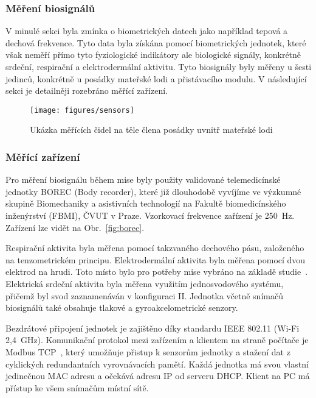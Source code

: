 \subsubsection{Měření biosignálů}
\label{subsubsec:mereni_biosignalu}
V minulé sekci byla zmínka o biometrických datech jako například tepová a
dechová frekvence. Tyto data byla získána pomocí biometrických jednotek, které
však neměří přímo tyto fyziologické indikátory ale biologické signály, konkrétně
srdeční, respirační a elektrodermální aktivitu. Tyto biosignály byly měřeny u
šesti jedinců, konkrétně u posádky mateřské lodi a přistávacího modulu. V
následující sekci je detailněji rozebráno měřící zařízení.

\begin{figure}[h]
    \begin{center}
        \texttt{[image: figures/sensors]}
        \caption{Ukázka měřících čidel na těle člena posádky uvnitř mateřské lodi}
        \label{fig:sensors}
    \end{center}
\end{figure}

\subsubsection{Měřící zařízení}
\label{subsubsec:merici_zarizeni}
Pro měření biosignálu během mise byly použity validované telemedicínské jednotky
\gls{BOREC} (Body recorder), které již dlouhodobě vyvíjíme ve výzkumné skupině
Biomechaniky a asistivních technologií na Fakultě biomedicínského inženýrství
(\gls{FBMI}), ČVUT v Praze. Vzorkovací frekvence zařízení je 250~Hz. Zařízení lze
vidět na Obr.~\ref{fig:borec}.

Respirační aktivita byla měřena pomocí takzvaného dechového pásu, založeného na
tenzometrickém principu. Elektrodermální aktivita byla měřena pomocí dvou
elektrod na hrudi. Toto místo bylo pro potřeby mise vybráno na základě
studie~\cite{Janssen2012}. Elektrická srdeční aktivita byla měřena využitím
jednosvodového systému, přičemž byl svod zaznamenáván v konfiguraci II. Jednotka
včetně snímačů biosignálů také obsahuje tlakové a gyroakcelometrické senzory.

Bezdrátové připojení jednotek je zajištěno díky standardu IEEE 802.11 (Wi-Fi
2,4~GHz). Komunikační protokol mezi zařízením a klientem na straně počítače je
Modbus TCP~\cite{modbus}, který umožňuje přistup k senzorům jednotky a stažení
dat z cyklických redundantních vyrovnávacích pamětí. Každá jednotka má svou
vlastní jedinečnou MAC adresu a očekává adresu IP od serveru DHCP. Klient na PC
má přístup ke všem snímačům místní sítě.

